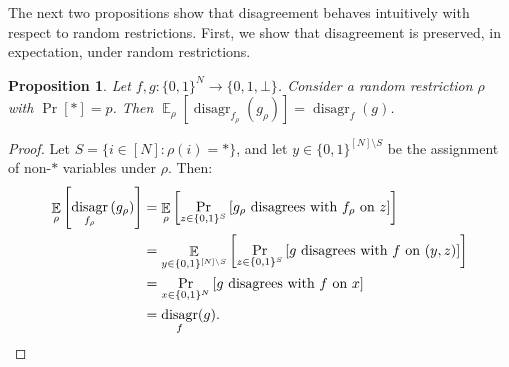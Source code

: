 \documentclass[10pt,a4paper]{article}
\newtheorem{proposition}[theorem]{Proposition}
\newcommand{\E}{\mathop{\mathbb{E}}}
\DeclareMathOperator{\disagr}{\mathrm{disagr}}
\begin{document}
The next two propositions show that disagreement behaves intuitively with respect to random restrictions. First, we show that disagreement is preserved, in expectation, under random restrictions.
\begin{proposition}
\label{prop:disagr_random_equal}
Let $f, g: \{0,1\}^N \to \{0,1,\bot\}$. Consider a random restriction $\rho$ with $\Pr[*] = p$. Then $\E_\rho\left[\disagr_{f_\rho}\left(g_\rho\right)\right] = \disagr_f(g)$.
\end{proposition}
\begin{proof}
Let $S = \{i \in [N]: \rho(i) = *\}$, and let $y \in \{0,1\}^{[N] \setminus S}$ be the assignment of non-$*$ variables under $\rho$. Then:
\begin{align*}
\E_\rho\left[\disagr_{f_\rho}\left(g_\rho\right)\right] &= \E_\rho\left[\Pr_{z \in \{0,1\}^S} \left[  g_\rho \text{ \rm disagrees with } f_\rho \text{ \rm on } z \right] \right]\\
&= \E_{y \in \{0,1\}^{[N] \setminus S}}\left[\Pr_{z \in \{0,1\}^S} \left[  g \text{ \rm disagrees with } f \text{ \rm on } (y, z) \right] \right]\\
&= \Pr_{x \in \{0,1\}^{N}}\left[g \text{ \rm disagrees with } f \text{ \rm on } x \right]\\
&= \disagr_f(g).\qedhere
\end{align*}
\end{proof}
\end{document}
